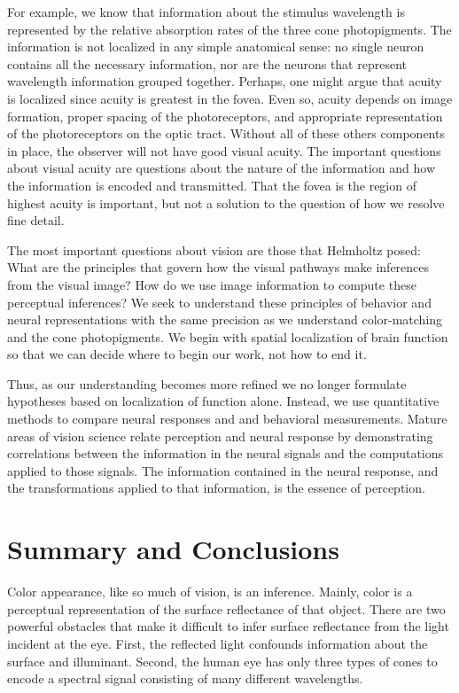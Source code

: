 For example, we know that information about the stimulus wavelength is
represented by the relative absorption rates of the three cone
photopigments.  The information is not localized in any simple
anatomical sense: no single neuron contains all the necessary
information, nor are the neurons that represent wavelength information
grouped together.  Perhaps, one might argue that acuity is localized
since acuity is greatest in the fovea.  Even so, acuity depends on
image formation, proper spacing of the photoreceptors, and appropriate
representation of the photoreceptors on the optic tract.  Without all
of these others components in place, the observer will not have good
visual acuity.  The important questions about visual acuity are
questions about the nature of the information and how the information
is encoded and transmitted.  That the fovea is the region of highest
acuity is important, but not a solution to the question of how we
resolve fine detail.

The most important questions about vision are those that Helmholtz
posed: What are the principles that govern how the visual pathways
make inferences from the visual image?  How do we use image
information to compute these perceptual inferences?  We seek to
understand these principles of behavior and neural representations
with the same precision as we understand color-matching and the cone
photopigments.  We begin with spatial localization of brain function
so that we can decide where to begin our work, not how to end it.

Thus, as our understanding becomes more refined we no longer formulate
hypotheses based on localization of function alone.  Instead, we use
quantitative methods to compare neural responses and and behavioral
measurements.  Mature areas of vision science relate perception and
neural response by demonstrating correlations between the information
in the neural signals and the computations applied to those signals.
The information contained in the neural response, and the
transformations applied to that information, is the essence of
perception.

\section{Summary and Conclusions}
Color appearance, like so much of vision, is an inference.  Mainly,
color is a perceptual representation of the surface reflectance of
that object.  There are two powerful obstacles that make it difficult
to infer surface reflectance from the light incident at the eye.
First, the reflected light confounds information about the surface and
illuminant.  Second, the human eye has only three types of cones to
encode a spectral signal consisting of many different wavelengths.

